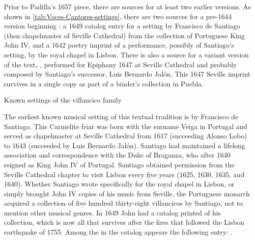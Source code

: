 Prior to Padilla's 1657 piece, there are sources for at least two earlier
versions. 
As shown in \cref{tab:Voces-Cantores-settings}, there are two sources for a
pre-1644 version beginning : a 1649 catalog
entry for a setting by Francisco de Santiago (then chapelmaster of Seville
Cathedral) from the collection of Portuguese King John IV, and a 1642 poetry
imprint of a performance, possibly of Santiago's setting, by the royal chapel in
Lisbon.
There is also a source for a variant version of the text, , performed for Epiphany 1647 at Seville Cathedral and probably composed
by Santiago's successor, Luis Bernardo Jalón.
This 1647 Seville imprint survives in a single copy as part of a binder's
collection in Puebla.

\begin{table}
    \caption{Known settings of the  villancico
    family}

    \label{tab:Voces-Cantores-settings}
\end{table}

The earliest known musical setting of this textual tradition is by Francisco de
Santiago.
This Carmelite friar was born with the surname Veiga in Portugal and served as
chapelmaster at Seville Cathedral from 1617 (succeeding Alonso Lobo) to 1643
(succeeded by Luis Bernardo Jalón).%
    \Autocites{Stevenson:SantiagoF}{Perez:DMEH-Santiago} 
Santiago had maintained a lifelong association and correspondence with the Duke
of Braganza, who after 1640 reigned as King John IV of Portugal.
Santiago obtained permission from the Seville Cathedral chapter to visit Lisbon
every five years (1625, 1630, 1635, and 1640).
Whether Santiago wrote specifically for the royal chapel in Lisbon, or simply
brought John IV copies of his music from Seville, the Portuguese monarch
acquired a collection of five hundred thirty-eight villancicos by Santiago, not
to mention other musical genres.
In 1649 John had a catalog printed of his collection, which is now all that
survives after the fires that followed the Lisbon earthquake of 1755.
Among the  in the
catalog appears the following entry:
.%
    \Autocites
    [caixão 26, ]{JohnIV:Catalog}
    [see also][]{Ribeiro:JohnIV}

